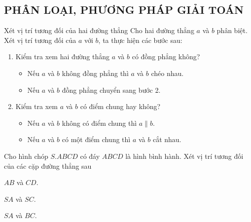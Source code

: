 \subsection{PHÂN LOẠI, PHƯƠNG PHÁP GIẢI TOÁN}
\setcounter{dang}{0}
\begin{dang} {Xét vị trí tương đối của hai đường thẳng}
	Cho hai đường thẳng $a$ và $b$ phân biệt. Xét vị trí tương đối của $a$ với $b$, ta thực hiện các bước sau:
		\begin{enumerate}[\iconCV]
		\item {}  Kiểm tra xem hai đường thẳng $a$ và $b$ có đồng phẳng không?
		\begin{itemize}
			\item Nếu $a$ và $b$ không đồng phẳng thì $a$ và $b$ chéo nhau.
			\item Nếu $a$ và $b$ đồng phẳng chuyển sang bước 2.
		\end{itemize}
		\item {} Kiểm tra xem $a$ và $b$ có điểm chung hay không?
			\begin{itemize}
				\item Nếu $a$ và $b$ không có điểm chung thì $a\parallel b$.
				\item Nếu $a$ và $b$ có một điểm chung thì $a$ và $b$ cắt nhau.
			\end{itemize}
		\end{enumerate}
\end{dang}
\begin{vd}
	Cho hình chóp $S.ABCD$ có đáy $ABCD$ là hình bình hành. Xét vị trí tương đối của các cặp đường thẳng sau
	\begin{listEX}[3]
		\item [a)] $AB$ và $CD$.
		\item [b)] $SA$ và $SC$.
		\item [c)] $SA$ và $BC$.
	\end{listEX}
\end{vd}
